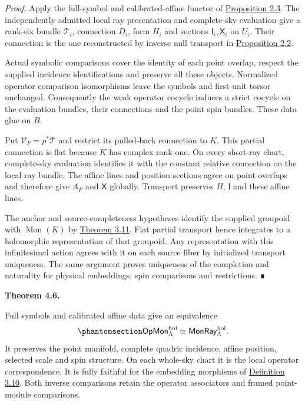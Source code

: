 \documentclass[
  english,
  11pt,
  reqno]{amsart}
\makeatletter
\newcommand{\pandocstatementheading}[1]{%
  \par\addpenalty{\@beginparpenalty}%
  \addvspace{.5\baselineskip plus .2\baselineskip minus .2\baselineskip}%
  {\normalfont\bfseries #1\par}%
  \nobreak\@afterindenttrue\@afterheading
}
\makeatother
\begin{document}
\emph{Proof.} Apply the full-symbol and calibrated-affine functor of
\hyperref[prop:independent-local-operator-input]{Proposition 2.3}. The
independently admitted local ray presentation and complete-sky
evaluation give a rank-six bundle \(\mathcal T_i\), connection \(D_i\),
form \(H_i\) and sections \(\mathsf I_i,\mathsf X_i\) on \(U_i\). Their
connection is the one reconstructed by inverse null transport in
\hyperref[prop:independent-local-ray-recognition-v09]{Proposition 2.2}.

Actual symbolic comparisons cover the identity of each point overlap,
respect the supplied incidence identifications and preserve all these
objects. Normalized operator comparison isomorphisms leave the symbols
and first-unit torsor unchanged. Consequently the weak operator cocycle
induces a strict cocycle on the evaluation bundles, their connections
and the point spin bundles. These data glue on \(B\).

Put \(\mathcal V_F=p^*\mathcal T\) and restrict its pulled-back
connection to \(K\). This partial connection is flat because \(K\) has
complex rank one. On every short-ray chart, complete-sky evaluation
identifies it with the constant relative connection on the local ray
bundle. The affine lines and position sections agree on point overlaps
and therefore give \(A_F\) and \(\mathsf X\) globally. Transport
preserves \(H\), \(\mathsf I\) and these affine lines.

The anchor and source-completeness hypotheses identify the supplied
groupoid with \(\operatorname{Mon}(K)\) by
\hyperref[thm:independent-monodromy-equivalence]{Theorem 3.11}. Flat
partial transport hence integrates to a holomorphic representation of
that groupoid. Any representation with this infinitesimal action agrees
with it on each source fiber by initialized transport uniqueness. The
same argument proves uniqueness of the completion and naturality for
physical embeddings, spin comparisons and restrictions. ∎

\pandocstatementheading{\protect{}\label{thm:operator-monodromy-equivalence}Theorem 4.6.}

Full symbols and calibrated affine data give an equivalence
\begin{equation}\protect\phantomsection\label{eq:operator-monodromy-equivalence}{
\mathsf{OpMon}^{\mathrm{hol}}_\Lambda
\simeq
\mathsf{MonRay}^{\mathrm{hol}}_\Lambda.
}\end{equation} It preserves the point manifold, complete quadric
incidence, affine position, selected scale and spin structure. On each
whole-sky chart it is the local operator correspondence. It is fully
faithful for the embedding morphisms of
\hyperref[def:independent-monodromy-source-v092]{Definition 3.10}. Both
inverse comparisons retain the operator associators and framed
point-module comparisons.
\end{document}
